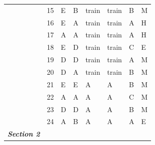 \documentclass[pageno]{jpaper}
\newcommand{\textbi}[1]{\textbf{\textit{#1}}}
\begin{document}
\begin{table}[]
\begin{tabular}{llllllll}
\textbf{}                & 15              & E                       & B                      & train                   & train                   & B                       & M                   \\
\textbf{}                & 16              & E                       & A                      & train                   & train                   & A                       & H                   \\
\textbf{}                & 17              & A                       & A                      & train                   & train                   & A                       & H                   \\
\textbf{}                & 18              & E                       & D                      & train                   & train                   & C                       & E                   \\
\textbf{}                & 19              & D                       & D                      & train                   & train                   & A                       & M                   \\
\textbf{}                & 20              & D                       & A                      & train                   & train                   & B                       & M                   \\
\textbf{}                & 21              & E                       & E                      & A                       & A                       & B                       & M                   \\
\textbf{}                & 22              & A                       & A                      & A                       & A                       & C                       & M                   \\
\textbf{}                & 23              & D                       & D                      & A                       & A                       & B                       & M                   \\
\textbf{}                & 24              & A                       & B                      & A                       & A                       & A                       & E                   \\ \midrule
\textbi{Section 2}       &                 &                         &                        &                         &                         &                         &                     \\ \midrule

\end{tabular}
\end{table}
\end{document}
